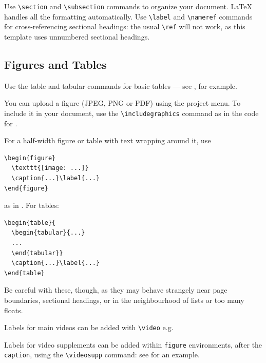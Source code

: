 \documentclass[9pt,lineno]{elife}
\begin{document}
Use \verb|\section| and \verb|\subsection| commands to organize your document. \LaTeX{} handles all the formatting automatically. Use \verb|\label| and \verb|\nameref| commands for cross-referencing sectional headings: the usual \verb|\ref| will not work, as this template uses unnumbered sectional headings.

\subsection{Figures and Tables}

Use the table and tabular commands for basic tables --- see , for example. 

You can upload a figure (JPEG, PNG or PDF) using the project menu. To include it in your document, use the \verb|\includegraphics| command as in the code for . 

For a half-width figure or table with text wrapping around it, use 

\begin{verbatim}
\begin{figure}
  \texttt{[image: ...]}
  \caption{...}\label{...}
\end{figure}
\end{verbatim}
%
as in . For tables:

\begin{verbatim}
\begin{table}{
  \begin{tabular}{...}
  ...
  \end{tabular}}
  \caption{...}\label{...}
\end{table}
\end{verbatim}

Be careful with these, though, as they may behave strangely near page boundaries, sectional headings, or in the neighbourhood of lists or too many floats.

Labels for main videos can be added with \verb|\video| e.g.

\label{video:mv1}

Labels for video supplements can be added within \texttt{figure} environments, after the \texttt{caption}, using the \verb|\videosupp| command: see  for an example.
\end{document}
